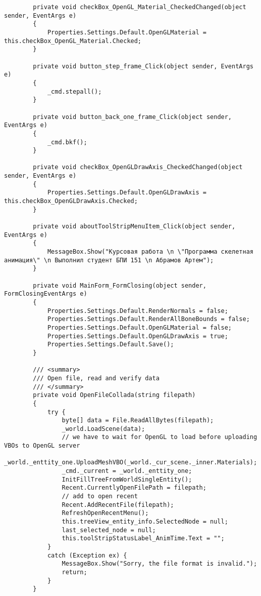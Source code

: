 \begin{scriptsize}
\begin{verbatim}
        private void checkBox_OpenGL_Material_CheckedChanged(object sender, EventArgs e)
        {
            Properties.Settings.Default.OpenGLMaterial = this.checkBox_OpenGL_Material.Checked;
        }

        private void button_step_frame_Click(object sender, EventArgs e)
        {
            _cmd.stepall();
        }

        private void button_back_one_frame_Click(object sender, EventArgs e)
        {
            _cmd.bkf();
        }

        private void checkBox_OpenGLDrawAxis_CheckedChanged(object sender, EventArgs e)
        {
            Properties.Settings.Default.OpenGLDrawAxis = this.checkBox_OpenGLDrawAxis.Checked;
        }

        private void aboutToolStripMenuItem_Click(object sender, EventArgs e)
        {
            MessageBox.Show("Курсовая работа \n \"Программа скелетная анимация\" \n Выполнил студент БПИ 151 \n Абрамов Артем");
        }

        private void MainForm_FormClosing(object sender, FormClosingEventArgs e)
        {
            Properties.Settings.Default.RenderNormals = false;
            Properties.Settings.Default.RenderAllBoneBounds = false;
            Properties.Settings.Default.OpenGLMaterial = false;
            Properties.Settings.Default.OpenGLDrawAxis = true;
            Properties.Settings.Default.Save();
        }

        /// <summary>
        /// Open file, read and verify data
        /// </summary>
        private void OpenFileCollada(string filepath)
        {
            try {
                byte[] data = File.ReadAllBytes(filepath);
                _world.LoadScene(data);
                // we have to wait for OpenGL to load before uploading VBOs to OpenGL server
                _world._enttity_one.UploadMeshVBO(_world._cur_scene._inner.Materials);
                _cmd._current = _world._enttity_one;
                InitFillTreeFromWorldSingleEntity();
                Recent.CurrentlyOpenFilePath = filepath;
                // add to open recent
                Recent.AddRecentFile(filepath);
                RefreshOpenRecentMenu();
                this.treeView_entity_info.SelectedNode = null;
                last_selected_node = null;
                this.toolStripStatusLabel_AnimTime.Text = "";
            }
            catch (Exception ex) {
                MessageBox.Show("Sorry, the file format is invalid.");
                return;
            }
        }


\end{verbatim}
\end{scriptsize}
